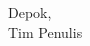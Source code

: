 
\vspace*{0.1cm}
\begin{flushright}
Depok, \tanggalSiapSidang\\[0.1cm]
\ifx\blank\npmDua
	\vspace*{1.5cm}
	\penulisSatu
\else
	Tim Penulis
\fi

\end{flushright}
